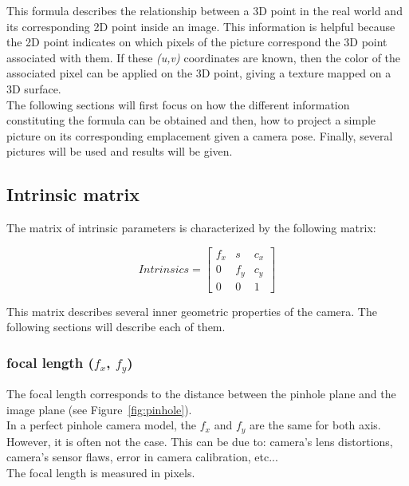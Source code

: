 This formula describes the relationship between a 3D point in the real world and its corresponding 2D point inside an image. This information is helpful because the 2D point indicates on which pixels of the picture correspond the 3D point associated with them. If these \textit{(u,v)} coordinates are known, then the color of the associated pixel can be applied on the 3D point, giving a texture mapped on a 3D surface.\\

The following sections will first focus on how the different information constituting the formula can be obtained and then, how to project a simple picture on its corresponding emplacement given a camera pose. Finally, several pictures will be used and results will be given.\\

\subsection{Intrinsic matrix}

The matrix of intrinsic parameters is characterized by the following matrix:

\begin{equation}
  Intrinsics = \begin{bmatrix}
       f_x & s & c_x \\
       0 & f_y & c_y \\
       0 & 0 & 1
     \end{bmatrix}   
\end{equation}

This matrix describes several inner geometric properties of the camera. The following sections will describe each of them. 

\subsubsection{focal length ($f_x$, $f_y$)}
The focal length corresponds to the distance between the pinhole plane and the image plane (see Figure~\ref{fig:pinhole}).\\

In a perfect pinhole camera model, the $f_x$ and $f_y$ are the same for both axis. However, it is often not the case. This can be due to: camera's lens distortions, camera's sensor flaws, error in camera calibration, etc...\\ 

The focal length is measured in pixels.\\


